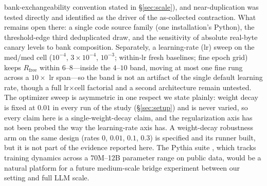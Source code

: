\documentclass[11pt]{article}
\begin{document}
bank-exchangeability convention stated in \S\ref{sec:scale}), and near-duplication was
tested directly and identified as the driver of the as-collected contraction. What
remains open there: a single code source family (one installation's Python), the
threshold-edge third deduplicated draw, and the sensitivity of absolute real-byte
canary levels to bank composition. Separately, a learning-rate (lr) sweep on the med/med
cell ($10^{-4}$, $3\times10^{-4}$, $10^{-3}$; within-lr fresh baselines; fine epoch
grid) keeps $R_{\mathrm{free}}$ within $6$--$8$---inside the $4$--$10$ band, moving at
most one fine rung across a $10\times$ lr span---so the band is not an artifact of the
single default learning rate, though a full lr$\times$cell factorial and a second
architecture remain untested. The optimizer sweep is asymmetric in one respect we
state plainly: weight decay is fixed at $0.01$ in every run of the study
(\S\ref{sec:setup}) and is never varied, so every claim here is a
single-weight-decay claim, and the regularization axis has not been probed the way
the learning-rate axis has. A weight-decay robustness arm on the same design
(rates $0$, $0.01$, $0.1$, $0.3$) is specified and its runner built, but it is not
part of the evidence reported here. The Pythia suite \citep{biderman2023pythia}, which tracks training dynamics
across a 70M--12B parameter range on public data, would be a natural platform for a future
medium-scale bridge experiment between our setting and full LLM scale.
\end{document}
